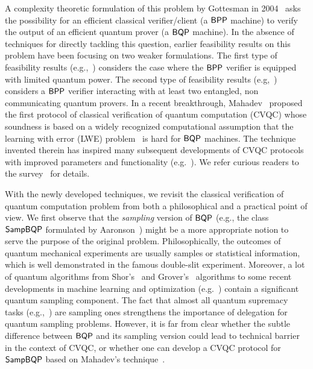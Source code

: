 A complexity theoretic formulation of this problem by Gottesman in 2004~\cite{web:Aaronson} asks the possibility for an efficient classical verifier/client (a $\operatorname{\mathsf{BPP}}$ machine) to verify the output of an
efficient quantum prover (a $\operatorname{\mathsf{BQP}}$ machine).
In the absence of techniques for directly tackling this question, earlier feasibility results on this problem have been focusing on two weaker formulations. 
The first type of feasibility results (e.g.,~\cite{BFK09,arXiv:ABOEM17,FK17,mf16}) considers the case where the $\operatorname{\mathsf{BPP}}$ verifier is equipped with limited quantum power.
The second type of feasibility results (e.g,~\cite{Nat:RUV13, CGJV19, Gheorghiu_2015, HPF15})
considers a $\operatorname{\mathsf{BPP}}$ verifier interacting with at least two entangled, non communicating quantum provers. 
In a recent breakthrough, Mahadev~\cite{FOCS:Mahadev18a} proposed the first protocol of classical verification of quantum computation (CVQC) whose soundness is based on a widely recognized computational assumption that the learning with error (LWE) problem~\cite{JACM:Regev09} is hard for $\operatorname{\mathsf{BQP}}$ machines. 
The technique invented therein has inspired many  subsequent developments of CVQC protocols with improved parameters and functionality (e.g.~\cite{FOCS:GheVid19,arXiv:AlaChiHun19,arXiv:ChiaChungYam19}). 
We refer curious readers to the survey~\cite{survey:GKK19} for details. 

With the newly developed techniques, we revisit the classical verification of quantum computation problem from both a philosophical and a practical point of view. 
We first observe that the \emph{sampling} version of $\operatorname{\mathsf{BQP}}$ (e.g., the class $\operatorname{\mathsf{SampBQP}}$ formulated by Aaronson~\cite{aaronson_2013}) might be a more appropriate notion to serve the purpose of the original problem. 
Philosophically, the outcomes of quantum mechanical experiments are usually samples or statistical information, which is well demonstrated in the famous double-slit experiment. 
Moreover, a lot of quantum algorithms from Shor's~\cite{Shor} and Grover's~\cite{Grover} algorithms to some recent developments in machine learning and optimization (e.g.~\cite{brando_et_al:LIPIcs:2019:10603, AGGW17,pmlr-v97-li19b}) contain a significant quantum sampling component. 
The fact that almost all quantum supremacy tasks (e.g.,~\cite{Boson, IQP, nature-google}) are sampling ones strengthens the importance of delegation for quantum sampling problems. 
However, it is far from clear whether the subtle difference between $\operatorname{\mathsf{BQP}}$ and its sampling version could lead to 
technical barrier in the context of CVQC, or 
whether one can develop a CVQC protocol for $\operatorname{\mathsf{SampBQP}}$ based on Mahadev's technique~\cite{FOCS:Mahadev18a}.

